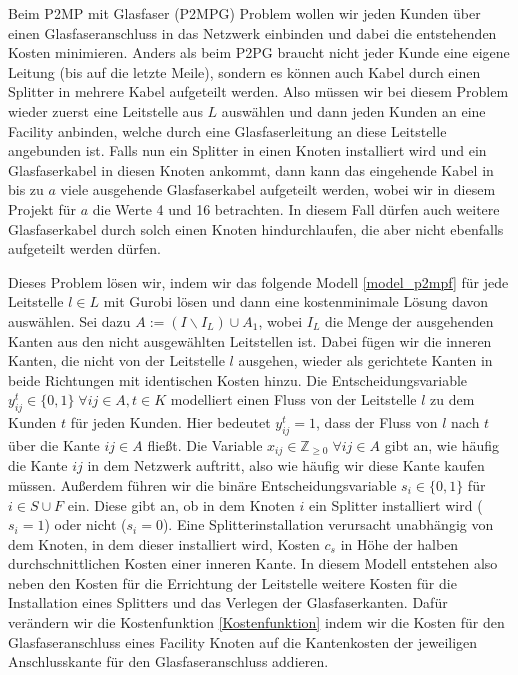 \documentclass[11pt,a4paper]{article}
\newcommand{\Z}{\mathbb{Z}}
\theoremstyle{my_th_style1}
\begin{document}
Beim P2MP mit Glasfaser (P2MPG) Problem wollen wir jeden Kunden \"uber einen Glasfaseranschluss in das Netzwerk einbinden und dabei die entstehenden Kosten minimieren.
Anders als beim P2PG braucht nicht jeder Kunde eine eigene Leitung (bis auf die letzte Meile), sondern es k\"onnen auch Kabel durch einen Splitter in mehrere Kabel aufgeteilt werden.
Also m\"ussen wir bei diesem Problem wieder zuerst eine Leitstelle aus $L$ ausw\"ahlen und dann jeden Kunden an eine Facility anbinden, welche durch eine Glasfaserleitung an diese Leitstelle angebunden ist.
Falls nun ein Splitter in einen Knoten installiert wird und ein Glasfaserkabel in diesen Knoten ankommt, dann kann das eingehende Kabel in bis zu $a$ viele ausgehende Glasfaserkabel aufgeteilt werden, wobei wir in diesem Projekt f\"ur $a$ die Werte 4 und 16 betrachten.
In diesem Fall d\"urfen auch weitere Glasfaserkabel durch solch einen Knoten hindurchlaufen, die aber nicht ebenfalls aufgeteilt werden d\"urfen.

Dieses Problem lösen wir, indem wir das folgende Modell \ref{model_p2mpf} für jede Leitstelle $l \in L $ mit Gurobi \cite{gurobi} lösen und dann eine kostenminimale L\"osung davon ausw\"ahlen.
Sei dazu $A:= (I \backslash I_L) \cup A_1$, wobei $I_L$ die Menge der ausgehenden Kanten aus den nicht ausgewählten Leitstellen ist.
Dabei f\"ugen wir die inneren Kanten, die nicht von der Leitstelle \(l\) ausgehen, wieder als gerichtete Kanten in beide Richtungen mit identischen Kosten hinzu.
Die Entscheidungsvariable $y_{ij}^t \in \{0,1\}\; \forall ij \in A, t \in K$ modelliert einen Fluss von der Leitstelle $l$ zu dem Kunden $t$ für jeden Kunden.
Hier bedeutet $y_{ij}^t=1$, dass der Fluss von $l$ nach $t$ über die Kante $ij \in A$ fließt.
Die Variable $x_{ij} \in \Z_{\geq 0} \; \forall ij \in A $ gibt an, wie häufig die Kante \(ij\) in dem Netzwerk auftritt, also wie häufig wir diese Kante kaufen müssen.
Außerdem f\"uhren wir die binäre Entscheidungsvariable $s_i \in \{0,1\}$ für $i \in S \cup F$ ein.
Diese gibt an, ob in dem Knoten $i$ ein Splitter installiert wird ($s_i=1$) oder nicht ($s_i=0$).
Eine Splitterinstallation verursacht unabh\"angig von dem Knoten, in dem dieser installiert wird, Kosten \(c_s\) in H\"ohe der halben durchschnittlichen Kosten einer inneren Kante.
In diesem Modell entstehen also neben den Kosten f\"ur die Errichtung der Leitstelle weitere Kosten f\"ur die Installation eines Splitters und das Verlegen der Glasfaserkanten.
Daf\"ur ver\"andern wir die Kostenfunktion \eqref{Kostenfunktion} indem wir die Kosten für den Glasfaseranschluss eines Facility Knoten auf die Kantenkosten der jeweiligen Anschlusskante für den Glasfaseranschluss addieren.
\end{document}
